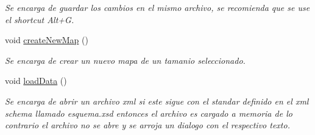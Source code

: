 \begin{DoxyCompactItemize}
\begin{DoxyCompactList}\small\item\em Se encarga de guardar los cambios en el mismo archivo, se recomienda que se use el shortcut Alt+\-G. \end{DoxyCompactList}\item 
void \hyperlink{class_map_maker_a79fd5a327db129f3876895aa1ef9dc24}{create\-New\-Map} ()
\begin{DoxyCompactList}\small\item\em Se encarga de crear un nuevo mapa de un tamanio seleccionado. \end{DoxyCompactList}\item 
\hypertarget{class_map_maker_a453e645083e5444d39ae6d52f6829e7d}{void \hyperlink{class_map_maker_a453e645083e5444d39ae6d52f6829e7d}{load\-Data} ()}\label{class_map_maker_a453e645083e5444d39ae6d52f6829e7d}

\begin{DoxyCompactList}\small\item\em Se encarga de abrir un archivo xml si este sigue con el standar definido en el xml schema llamado esquema.\-xsd entonces el archivo es cargado a memoria de lo contrario el archivo no se abre y se arroja un dialogo con el respectivo texto. \end{DoxyCompactList}\end{DoxyCompactItemize}
